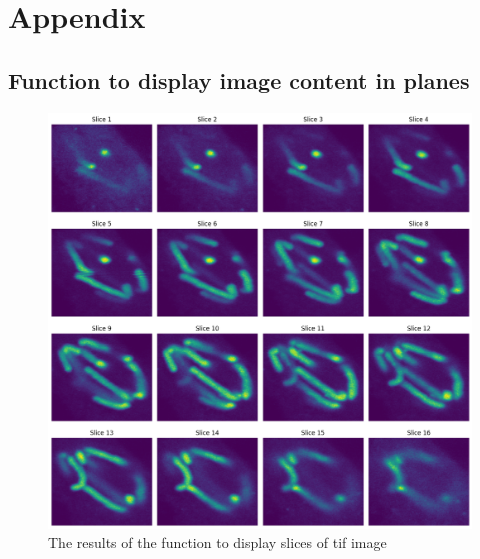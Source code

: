\documentclass{article}
\begin{document}
\section*{Appendix}
\subsection*{Function to display image content in planes}
\begin{figure}[h!]
    \centering
    \includegraphics[width=1\linewidth]{Report/Images/3d_plot.png}
    \caption{The results of the function to display slices of tif image}
    \label{fig:3d-plane-image}
\end{figure}
% 
% 
\end{document}
